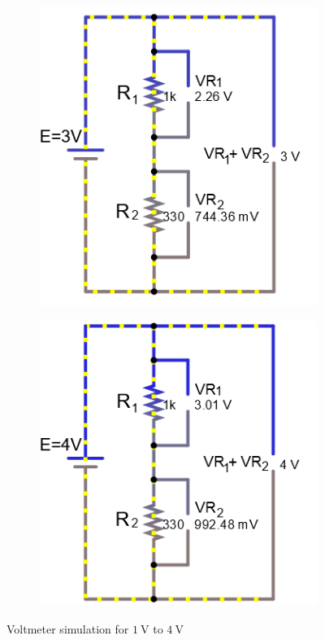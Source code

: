 \documentclass[a4paper]{article}
\begin{document}
\begin{figure}[H]
\begin{subfigure}{0.48\textwidth}
\end{subfigure}
\begin{subfigure}{0.48\textwidth}
\includegraphics[width=.9\linewidth]{volts_3}
\end{subfigure}
\begin{subfigure}{0.48\textwidth}
\includegraphics[width=.9	\linewidth]{volts_4}
\end{subfigure}
\caption{Voltmeter simulation for $\SI{1}{\volt}$ to $\SI{4}{\volt}$}
\end{figure}
\end{document}
